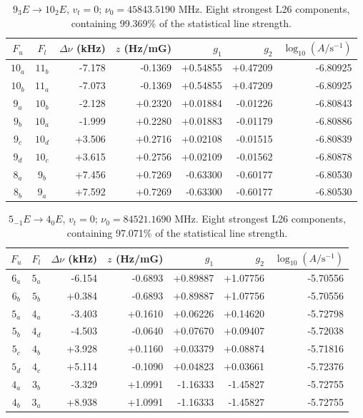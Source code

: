 \begin{table}[!htbp]
\centering\small\renewcommand{\arraystretch}{1.1}\setlength{\tabcolsep}{5pt}
\caption{$9_{3} E\rightarrow 10_{2} E$, $v_t=0$; $\nu_0=45843.5190$ MHz. Eight strongest L26 components, containing 99.369\% of the statistical line strength.}
\label{tab:sm-zeeman-45p8}
\begin{tabular}{ccrrrrr}
\hline\hline
$F_u$ & $F_l$ & $\Delta\nu$ (kHz) & $z$ (Hz/mG) & $g_1$ & $g_2$ & $\log_{10}(A/\mathrm{s}^{-1})$ \\
\hline
$10_{a}$ & $11_{b}$ & -7.178 & -0.1369 & +0.54855 & +0.47209 & -6.80925\\
$10_{b}$ & $11_{a}$ & -7.073 & -0.1369 & +0.54855 & +0.47209 & -6.80925\\
$9_{a}$ & $10_{b}$ & -2.128 & +0.2320 & +0.01884 & -0.01226 & -6.80843\\
$9_{b}$ & $10_{a}$ & -1.999 & +0.2280 & +0.01883 & -0.01179 & -6.80886\\
$9_{c}$ & $10_{d}$ & +3.506 & +0.2716 & +0.02108 & -0.01515 & -6.80839\\
$9_{d}$ & $10_{c}$ & +3.615 & +0.2756 & +0.02109 & -0.01562 & -6.80878\\
$8_{a}$ & $9_{b}$ & +7.456 & +0.7269 & -0.63300 & -0.60177 & -6.80530\\
$8_{b}$ & $9_{a}$ & +7.592 & +0.7269 & -0.63300 & -0.60177 & -6.80530\\
\hline\end{tabular}
\end{table}

\begin{table}[!htbp]
\centering\small\renewcommand{\arraystretch}{1.1}\setlength{\tabcolsep}{5pt}
\caption{$5_{-1} E\rightarrow 4_{0} E$, $v_t=0$; $\nu_0=84521.1690$ MHz. Eight strongest L26 components, containing 97.071\% of the statistical line strength.}
\label{tab:sm-zeeman-85}
\begin{tabular}{ccrrrrr}
\hline\hline
$F_u$ & $F_l$ & $\Delta\nu$ (kHz) & $z$ (Hz/mG) & $g_1$ & $g_2$ & $\log_{10}(A/\mathrm{s}^{-1})$ \\
\hline
$6_{a}$ & $5_{a}$ & -6.154 & -0.6893 & +0.89887 & +1.07756 & -5.70556\\
$6_{b}$ & $5_{b}$ & +0.384 & -0.6893 & +0.89887 & +1.07756 & -5.70556\\
$5_{a}$ & $4_{a}$ & -3.403 & +0.1610 & +0.06226 & +0.14620 & -5.72798\\
$5_{b}$ & $4_{d}$ & -4.503 & -0.0640 & +0.07670 & +0.09407 & -5.72038\\
$5_{c}$ & $4_{b}$ & +3.928 & +0.1160 & +0.03379 & +0.08874 & -5.71816\\
$5_{d}$ & $4_{c}$ & +5.114 & -0.1090 & +0.04823 & +0.03661 & -5.72376\\
$4_{a}$ & $3_{b}$ & -3.329 & +1.0991 & -1.16333 & -1.45827 & -5.72755\\
$4_{b}$ & $3_{a}$ & +8.938 & +1.0991 & -1.16333 & -1.45827 & -5.72755\\
\hline\end{tabular}
\end{table}

